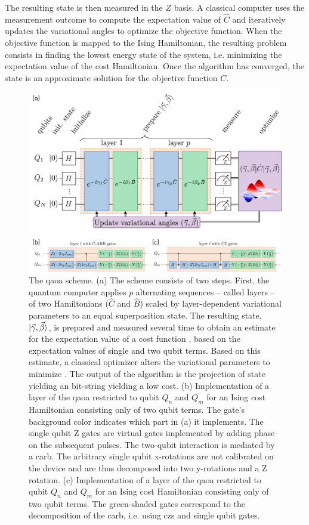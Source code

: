 The resulting state \qaoaMeasuredState{} is then measured in the $Z$ basis. A classical computer uses the measurement outcome to compute the expectation value of $\hat C$ and iteratively updates the variational angles to optimize the objective function. When the objective function is mapped to the Ising Hamiltonian, the resulting problem consists in finding the lowest energy state of the system, i.e. minimizing the expectation value of the cost Hamiltonian. Once the algorithm has converged, the state \optimalstate{} is an approximate solution for the objective function $C$.

\begin{figure}
    \centering
    \includegraphics[width=\textwidth]{chapters/qaoa/figs/qaoa_scheme.png}
    \caption{The \gls{qaoa} scheme. (a) The scheme consists of two steps. First, the quantum computer applies $p$ alternating sequences -- called layers -- of two Hamiltonians ($\hat C$ and $\hat B$) scaled by layer-dependent variational parameters to an equal superposition state. The resulting state, $\ket{\vec\gamma,\vec\beta}$, is prepared and measured several time to obtain an estimate for the expectation value of a cost function \cost{}, based on the expectation values of single and two qubit terms. Based on this estimate, a classical optimizer alters the variational parameters to minimize \cost{}. The output of the algorithm is the projection of state \optimalstate{} yielding an bit-string yielding a low cost. (b) Implementation of a layer of the \gls{qaoa} restricted to qubit $Q_n$ and $Q_m$ for an Ising cost Hamiltonian consisting only of two qubit terms. The gate's background color indicates which part in (a) it implements. The single qubit Z gates are virtual gates implemented by adding phase on the subsequent pulses. The two-qubit interaction is mediated by a \gls{carb}. The arbitrary single qubit x-rotations are not calibrated on the device and are thus decomposed into two y-rotations and a Z rotation. (c) Implementation of a layer of the \gls{qaoa} restricted to qubit $Q_n$ and $Q_m$ for an Ising cost Hamiltonian consisting only of two qubit terms. The green-shaded gates correspond to the decomposition of the \gls{carb}, i.e. using \glspl{cz} and single qubit gates.}
    \label{fig:qaoa_scheme}
\end{figure}
